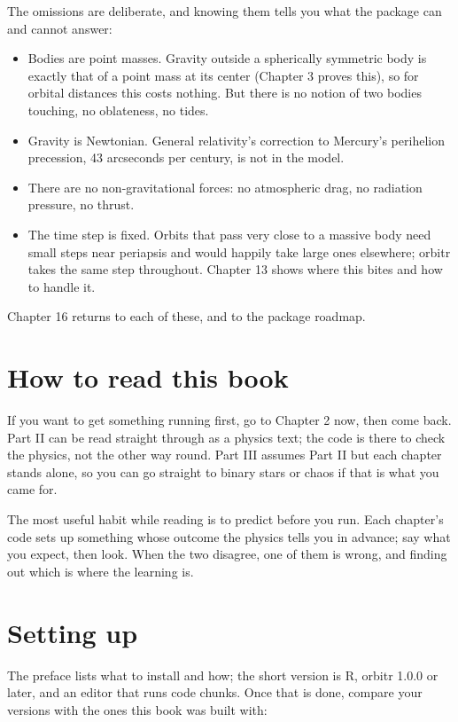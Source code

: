 \documentclass[
  10.5pt,
  letterpaper,
]{scrbook}
\providecommand{\tightlist}{%
  \setlength{\itemsep}{0pt}\setlength{\parskip}{0pt}}
\theoremstyle{plain}
\theoremstyle{remark}
\begin{document}
The omissions are deliberate, and knowing them tells you what the
package can and cannot answer:

\begin{itemize}
\tightlist
\item
  Bodies are point masses. Gravity outside a spherically symmetric body
  is exactly that of a point mass at its center (Chapter 3 proves this),
  so for orbital distances this costs nothing. But there is no notion of
  two bodies touching, no oblateness, no tides.
\item
  Gravity is Newtonian. General relativity's correction to Mercury's
  perihelion precession, 43 arcseconds per century, is not in the model.
\item
  There are no non-gravitational forces: no atmospheric drag, no
  radiation pressure, no thrust.
\item
  The time step is fixed. Orbits that pass very close to a massive body
  need small steps near periapsis and would happily take large ones
  elsewhere; orbitr takes the same step throughout. Chapter 13 shows
  where this bites and how to handle it.
\end{itemize}

Chapter 16 returns to each of these, and to the package roadmap.

\section{How to read this book}\label{how-to-read-this-book}

If you want to get something running first, go to Chapter 2 now, then
come back. Part II can be read straight through as a physics text; the
code is there to check the physics, not the other way round. Part III
assumes Part II but each chapter stands alone, so you can go straight to
binary stars or chaos if that is what you came for.

The most useful habit while reading is to predict before you run. Each
chapter's code sets up something whose outcome the physics tells you in
advance; say what you expect, then look. When the two disagree, one of
them is wrong, and finding out which is where the learning is.

\section{Setting up}\label{setting-up}

The preface lists what to install and how; the short version is R,
orbitr 1.0.0 or later, and an editor that runs code chunks. Once that is
done, compare your versions with the ones this book was built with:
\end{document}

